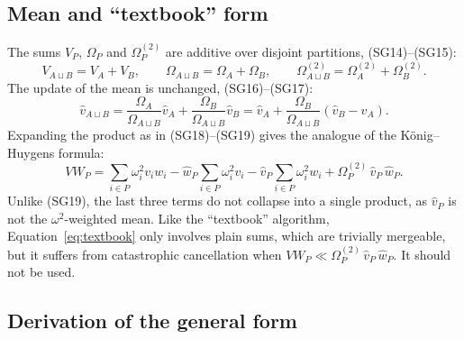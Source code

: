 \documentclass[a4paper,11pt]{article}
\newcommand{\mean}[1]{\widehat{#1}}
\newcommand{\Om}{\Omega}
\newcommand{\OmS}{\Omega^{(2)}}
\newcommand{\AB}{{A\sqcup B}}
\begin{document}
\subsection{Mean and ``textbook'' form}

The sums $V_P$, $\Om_P$ and $\OmS_P$ are additive over disjoint partitions, (SG14)--(SG15):
\begin{equation}
  V_\AB = V_A + V_B, \qquad \Om_\AB = \Om_A + \Om_B, \qquad \OmS_\AB = \OmS_A + \OmS_B.
\end{equation}
The update of the mean is unchanged, (SG16)--(SG17):
\begin{equation}
  \mean{v}_\AB = \frac{\Om_A}{\Om_\AB}\mean{v}_A + \frac{\Om_B}{\Om_\AB}\mean{v}_B
               = \mean{v}_A + \frac{\Om_B}{\Om_\AB}\left(\mean{v}_B - \mean{v}_A\right).
  \label{eq:mean}
\end{equation}
Expanding the product as in (SG18)--(SG19) gives the analogue of the König--Huygens formula:
\begin{equation}
  VW_P = \sum_{i\in P}\omega_i^2 v_i w_i - \mean{w}_P\sum_{i\in P}\omega_i^2 v_i
         - \mean{v}_P\sum_{i\in P}\omega_i^2 w_i + \OmS_P\,\mean{v}_P\,\mean{w}_P .
  \label{eq:textbook}
\end{equation}
Unlike (SG19), the last three terms do not collapse into a single product, as $\mean{v}_P$ is not the
$\omega^2$-weighted mean. Like the ``textbook'' algorithm, Equation~\eqref{eq:textbook} only involves
plain sums, which are trivially mergeable, but it suffers from catastrophic cancellation when
$VW_P \ll \OmS_P\,\mean{v}_P\,\mean{w}_P$. It should not be used.

\subsection{Derivation of the general form}
\label{sec:derivation}
\end{document}
